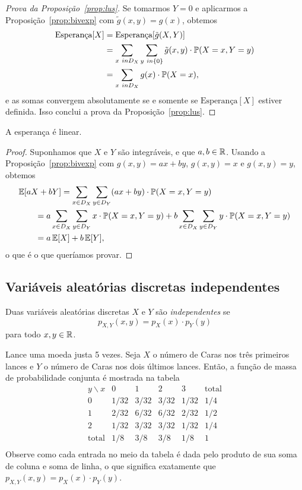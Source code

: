 \begin{proof}
[Prova da Proposição~\ref{prop:lus}]
Se tomarmos $ Y=0 $ e aplicarmos a Proposição~\ref{prop:bivexp} com $ \tilde{g}(x,y)=g(x) $, obtemos
\begin{align}
\text{Esperança}[X]
&
=
\text{Esperança}[\tilde{g}(X,Y)]
\\
&
=
\sum_{x \ in D_X } \sum_{y \ in \{0\}} \tilde{g}(x,y) \cdot \mathbb{P}(X=x,Y=y)
\\
&
=
\sum_{x \ in D_X } {g}(x) \cdot \mathbb{P}(X=x),
\end{align}
e as somas convergem absolutamente se e somente se $ \text{Esperança}[X] $ estiver definida.
Isso conclui a prova da Proposição~\ref{prop:lus}.
\end{proof}

\begin{corollary}
A esperança é linear.
\end{corollary}
\begin{proof}
Suponhamos que $X$ e $Y$ são integráveis, e que $a, b \in \mathbb{R}$.
Usando a Proposição~\ref{prop:bivexp} com $g(x,y)=ax+by$, $g(x,y)=x$ e $g(x,y)=y$, obtemos
\begin{align}
\MoveEqLeft
\E[aX+bY]
=
\sum_{x \in D_X } \sum_{y \in D_Y} (ax+by) \cdot \Pb(X=x,Y=y)
\\
& =
a
\sum_{x \in D_X } \sum_{y \in D_Y} x \cdot \Pb(X=x,Y=y)
+
b
\sum_{x \in D_X } \sum_{y \in D_Y} y \cdot \Pb(X=x,Y=y)
\\
& =
a \, \E[X] + b \, \E[Y],
\end{align}
o que é o que queríamos provar.
\end{proof}

\subsection{Variáveis aleatórias discretas independentes}
\label{sub:independencerv}

\begin{definition}
[Independência]
Duas variáveis aleatórias discretas $X$ e $Y$ são \emph{independentes} se
\[
p_{X,Y}(x,y) = p_X(x) \cdot p_Y(y)
\]
para todo $x, y \in \mathbb{R}$.
\end{definition}

\begin{example}
Lance uma moeda justa 5 vezes.
Seja $X$ o número de Caras nos três primeiros lances e $Y$ o número de Caras nos dois últimos lances.
Então, a função de massa de probabilidade conjunta é mostrada na tabela
\[
\begin{array}{c|cccc|c}
y \backslash x	&	0	&	1	&	2	&	3	&	\text{total}	\\
\hline
0	&	  1/32	&	  3/32	&	  3/32	&	  1/32	&	1/4	\\
1	&	  2/32	&	  6/32	&	  6/32	&	  2/32	&	1/2	\\
2	&	  1/32	&	  3/32	&	  3/32	&	  1/32	&	1/4	\\
\hline
\text{total}	&	1/8	&	3/8	&	3/8	&	1/8	&	1	\\
\end{array}
\]
Observe como cada entrada no meio da tabela é dada pelo produto de sua soma de coluna e soma de linha, o que significa exatamente que $p_{X,Y}(x,y) = p_X(x) \cdot p_Y(y)$.
\end{example}

